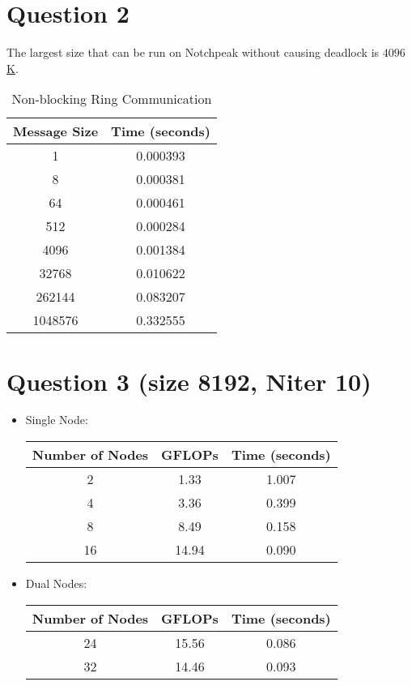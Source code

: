 \documentclass[11pt]{amsart}
\begin{document}
\section*{Question 2}
The largest size that can be run on Notchpeak without causing deadlock is \underline{$4096$K}.

\begin{table}[h]
  \centering
  \caption{Non-blocking Ring Communication}
	\begin{tabular}{|c|c|}
		\hline
    Message Size&Time (seconds)\\
    \hline
    1&0.000393\\
    8&0.000381\\
    64&0.000461\\
    512&0.000284\\
    4096&0.001384\\
    32768&0.010622\\
    262144&0.083207\\
    1048576&0.332555\\
    \hline
	\end{tabular}
\end{table}
\newpage
\section*{Question 3 (size 8192, Niter 10)}
\begin{itemize}
\item Single Node:

\begin{table}[h]
\begin{tabular}{|c|c|c|}
  \hline
  Number of Nodes&GFLOPs&Time (seconds)\\
  \hline
  2&1.33&1.007\\
  4&3.36&0.399\\
  8&8.49&0.158\\
  16&14.94&0.090\\
  \hline
\end{tabular}
\end{table}
\item Dual Nodes:

\begin{table}[h]
\begin{tabular}{|c|c|c|}
  \hline
  Number of Nodes&GFLOPs&Time (seconds)\\
  \hline
  24&15.56&0.086\\
  32&14.46&0.093\\
  \hline
\end{tabular}
\end{table}
\end{itemize}
\end{document}
